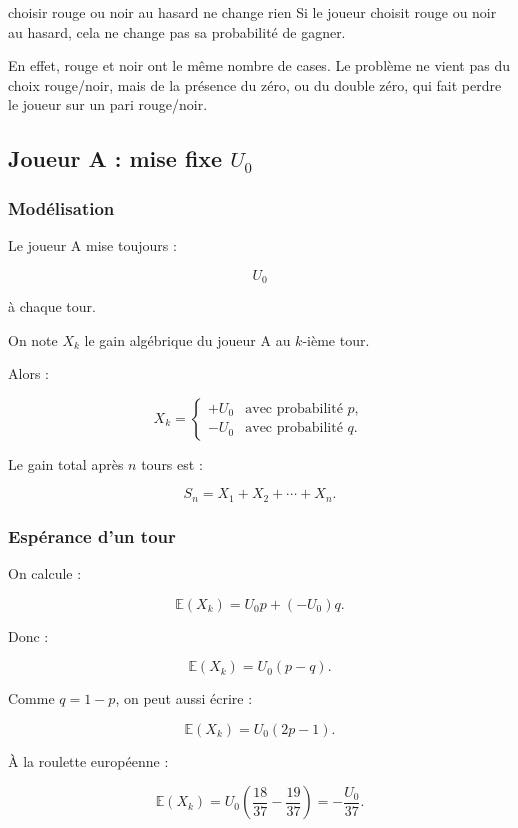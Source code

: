 \documentclass[11pt,a4paper]{article}
\begin{document}
\begin{attention}{choisir rouge ou noir au hasard ne change rien}
Si le joueur choisit rouge ou noir au hasard, cela ne change pas sa probabilité de gagner.

En effet, rouge et noir ont le même nombre de cases. Le problème ne vient pas du choix rouge/noir, mais de la présence du zéro, ou du double zéro, qui fait perdre le joueur sur un pari rouge/noir.
\end{attention}

\subsection{Joueur A : mise fixe \(U_0\)}

\subsubsection*{Modélisation}

Le joueur A mise toujours :

\[
U_0
\]

à chaque tour.

On note \(X_k\) le gain algébrique du joueur A au \(k\)-ième tour.

Alors :

\[
X_k=
\begin{cases}
+U_0 & \text{avec probabilité }p,\\
-U_0 & \text{avec probabilité }q.
\end{cases}
\]

Le gain total après \(n\) tours est :

\[
S_n=X_1+X_2+\cdots+X_n.
\]

\subsubsection*{Espérance d'un tour}

On calcule :

\[
\mathbb{E}(X_k)
=
U_0p+(-U_0)q.
\]

Donc :

\[
\mathbb{E}(X_k)
=
U_0(p-q).
\]

Comme \(q=1-p\), on peut aussi écrire :

\[
\mathbb{E}(X_k)=U_0(2p-1).
\]

À la roulette européenne :

\[
\mathbb{E}(X_k)
=
U_0\left(\frac{18}{37}-\frac{19}{37}\right)
=
-\frac{U_0}{37}.
\]
\end{document}
